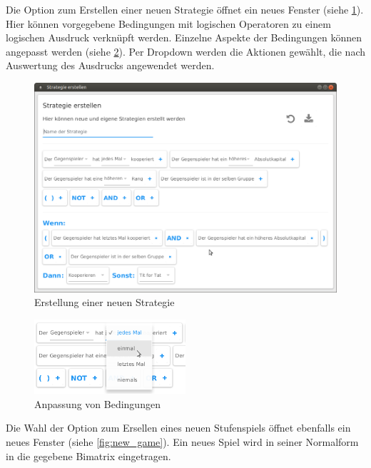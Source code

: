 \documentclass[parskip=full,11pt]{scrartcl}
\begin{document}
\newpage


Die Option zum Erstellen einer neuen Strategie öffnet ein neues Fenster (siehe \cref{fig:strategy}). Hier können vorgegebene Bedingungen mit logischen Operatoren zu einem logischen Ausdruck verknüpft werden. Einzelne Aspekte der Bedingungen können angepasst werden (siehe \cref{fig:strategy_drop}). Per Dropdown werden die Aktionen gewählt, die nach Auswertung des Ausdrucks angewendet werden.


\begin{figure}[hb]
	\centering
	\includegraphics[width=\textwidth]{images/strategy.png}
	\caption{\label{fig:strategy}
		Erstellung einer neuen Strategie}
\end{figure}


\begin{figure}[hb]
	\centering
	\includegraphics[width=0.5\textwidth]{images/strategy_drop.png}
	\caption{\label{fig:strategy_drop}
		Anpassung von Bedingungen}
\end{figure}

Die Wahl der Option zum Ersellen eines neuen Stufenspiels öffnet ebenfalls ein neues Fenster (siehe \cref{fig:new_game}). Ein neues Spiel wird in seiner Normalform in die gegebene Bimatrix eingetragen.
\end{document}
